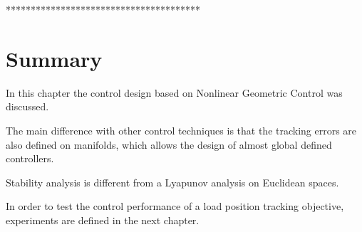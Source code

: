 ***************************************\\

\section*{Summary}

In this chapter the control design based on Nonlinear Geometric Control was discussed.

The main difference with other control techniques is that the tracking errors are also defined on manifolds, which allows the design of almost global defined controllers.

Stability analysis is different from a Lyapunov analysis on Euclidean spaces.


In order to test the control performance of a load position tracking objective, experiments are defined in the next chapter. 





